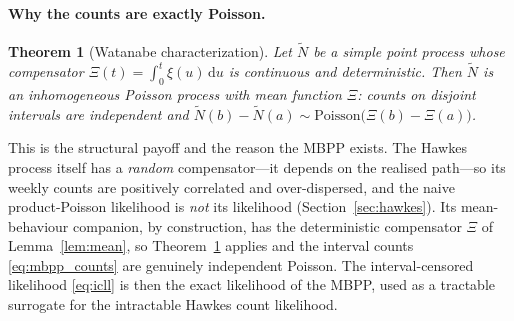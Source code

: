 \documentclass[11pt]{article}
\theoremstyle{plain}
\newtheorem{theorem}[proposition]{Theorem}
\theoremstyle{definition}
\theoremstyle{remark}
\newcommand{\dd}{\,\mathrm{d}}
\begin{document}
\paragraph{Why the counts are exactly Poisson.}
\begin{theorem}[Watanabe characterization]
\label{thm:watanabe}
Let $\widetilde N$ be a simple point process whose compensator $\Xi(t)=\int_0^t\xi(u)\dd u$ is continuous and \emph{deterministic}. Then $\widetilde N$ is an inhomogeneous Poisson process with mean function $\Xi$: counts on disjoint intervals are independent and $\widetilde N(b)-\widetilde N(a)\sim\mathrm{Poisson}\big(\Xi(b)-\Xi(a)\big)$.
\end{theorem}
This is the structural payoff and the reason the MBPP exists. The Hawkes process itself has a \emph{random} compensator---it depends on the realised path---so its weekly counts are positively correlated and over-dispersed, and the naive product-Poisson likelihood is \emph{not} its likelihood (Section~\ref{sec:hawkes}). Its mean-behaviour companion, by construction, has the deterministic compensator $\Xi$ of Lemma~\ref{lem:mean}, so Theorem~\ref{thm:watanabe} applies and the interval counts \eqref{eq:mbpp_counts} are genuinely independent Poisson. The interval-censored likelihood \eqref{eq:icll} is then the exact likelihood of the MBPP, used as a tractable surrogate for the intractable Hawkes count likelihood.
\end{document}
